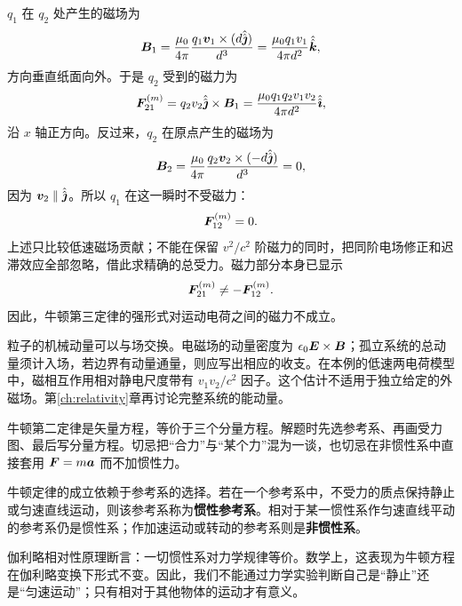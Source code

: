 \begin{center}
\end{center}

$q_1$ 在 $q_2$ 处产生的磁场为
\[
\boldsymbol{B}_1=\frac{\mu_0}{4\pi}\frac{q_1\boldsymbol{v}_1\times(d\hat{\hat{\boldsymbol{\jmath}}})}{d^3}
=\frac{\mu_0q_1v_1}{4\pi d^2}\hat{\hat{\boldsymbol{k}}},
\]
方向垂直纸面向外。于是 $q_2$ 受到的磁力为
\[
\boldsymbol{F}_{21}^{(m)}=q_2v_2\hat{\hat{\boldsymbol{\jmath}}}\times\boldsymbol{B}_1
=\frac{\mu_0q_1q_2v_1v_2}{4\pi d^2}\hat{\hat{\boldsymbol{\imath}}},
\]
沿 $x$ 轴正方向。反过来，$q_2$ 在原点产生的磁场为
\[
\boldsymbol{B}_2=\frac{\mu_0}{4\pi}\frac{q_2\boldsymbol{v}_2\times(-d\hat{\hat{\boldsymbol{\jmath}}})}{d^3}=0,
\]
因为 $\boldsymbol{v}_2\parallel \hat{\hat{\boldsymbol{\jmath}}}$。所以 $q_1$ 在这一瞬时不受磁力：
\[
\boldsymbol{F}_{12}^{(m)}=0.
\]
上述只比较低速磁场贡献；不能在保留 $v^2/c^2$ 阶磁力的同时，把同阶电场修正和迟滞效应全部忽略，借此求精确的总受力。磁力部分本身已显示
\[
\boldsymbol{F}_{21}^{(m)}\neq -\boldsymbol{F}_{12}^{(m)}.
\]
因此，牛顿第三定律的强形式对运动电荷之间的磁力不成立。

粒子的机械动量可以与场交换。电磁场的动量密度为 $\epsilon_0\boldsymbol{E}\times\boldsymbol{B}$；孤立系统的总动量须计入场，若边界有动量通量，则应写出相应的收支。在本例的低速两电荷模型中，磁相互作用相对静电尺度带有 $v_1v_2/c^2$ 因子。这个估计不适用于独立给定的外磁场。第\ref{ch:relativity}章再讨论完整系统的能动量。

\begin{physicsbox}
牛顿第二定律是矢量方程，等价于三个分量方程。解题时先选参考系、再画受力图、最后写分量方程。切忌把“合力”与“某个力”混为一谈，也切忌在非惯性系中直接套用 $\boldsymbol{F}=m\boldsymbol{a}$ 而不加惯性力。
\end{physicsbox}

牛顿定律的成立依赖于参考系的选择。若在一个参考系中，不受力的质点保持静止或匀速直线运动，则该参考系称为\textbf{惯性参考系}。相对于某一惯性系作匀速直线平动的参考系仍是惯性系；作加速运动或转动的参考系则是\textbf{非惯性系}。

伽利略相对性原理断言：一切惯性系对力学规律等价。数学上，这表现为牛顿方程在伽利略变换下形式不变。因此，我们不能通过力学实验判断自己是“静止”还是“匀速运动”；只有相对于其他物体的运动才有意义。

